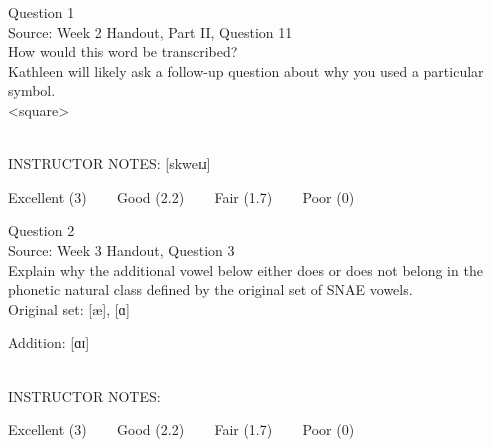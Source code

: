 \documentclass[12pt]{article}
\begin{document}
\begin{center}
\textbf{{\color{blue}{\HUGE START OF EXAM\\}}}

\textbf{{\color{blue}{\HUGE Student ID: 81020\\}}}

\textbf{{\color{blue}{\HUGE 4:10\\}}}

\end{center}
\newpage

{\large Question 1}\\

Source: Week 2 Handout, Part II, Question 11\\

How would this word be transcribed?\\ Kathleen will likely ask a follow-up question about why you used a particular symbol.\\

<square>


~\\
INSTRUCTOR NOTES: [skweɪɹ]


\vfill
Excellent (3) ~~~ Good (2.2) ~~~ Fair (1.7) ~~~ Poor (0)
\newpage

{\large Question 2}\\

Source: Week 3 Handout, Question 3\\

Explain why the additional vowel below either does or does not belong in the phonetic natural class defined by the original set of SNAE vowels.\\

Original set: {[æ]}, {[ɑ]}

Addition: {[ɑɪ]}


~\\
INSTRUCTOR NOTES: 


\vfill
Excellent (3) ~~~ Good (2.2) ~~~ Fair (1.7) ~~~ Poor (0)
\newpage

\begin{center}
\textbf{{\color{red}{\HUGE END OF EXAM}}}\\

\end{center}
\newpage

\begin{center}
\textbf{{\color{blue}{\HUGE START OF EXAM\\}}}

\textbf{{\color{blue}{\HUGE Student ID: 60523\\}}}

\textbf{{\color{blue}{\HUGE 4:20\\}}}

\end{center}
\newpage
\end{document}
